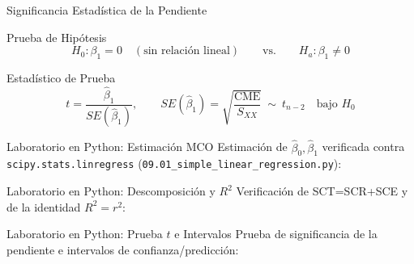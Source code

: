 \documentclass[10pt, aspectratio=169]{beamer}
\begin{document}
\begin{frame}{Significancia Estadística de la Pendiente}
  \footnotesize
  \begin{block}{Prueba de Hipótesis}
    $$H_0:\beta_1=0 \quad (\text{sin relación lineal}) \qquad \text{vs.} \qquad H_a:\beta_1\neq0$$
  \end{block}
  \pause

  \vspace{0.1cm}
  \begin{alertblock}{Estadístico de Prueba}
    $$t=\frac{\hat\beta_1}{SE(\hat\beta_1)}, \qquad SE(\hat\beta_1)=\sqrt{\frac{\text{CME}}{S_{XX}}} \ \sim\ t_{n-2} \quad\text{bajo } H_0$$
  \end{alertblock}
\end{frame}

\begin{frame}[fragile]{Laboratorio en Python: Estimación MCO}
  \scriptsize
  Estimación de $\hat\beta_0,\hat\beta_1$ verificada contra \texttt{scipy.stats.linregress} (\texttt{09.01\_simple\_linear\_regression.py}):
  {
  }
\end{frame}

\begin{frame}[fragile]{Laboratorio en Python: Descomposición y $R^2$}
  \scriptsize
  Verificación de SCT=SCR+SCE y de la identidad $R^2=r^2$:
  {
  }
\end{frame}

\begin{frame}[fragile]{Laboratorio en Python: Prueba $t$ e Intervalos}
  \scriptsize
  Prueba de significancia de la pendiente e intervalos de confianza/predicción:
  {
  }
\end{frame}
\end{document}
